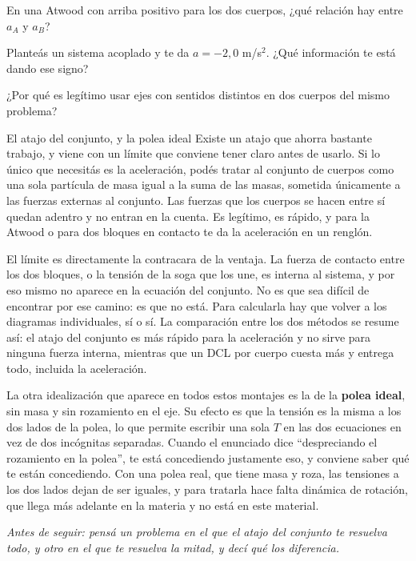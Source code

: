 \documentclass[11pt,openany]{book}
\begin{document}
\begin{chequeo}
\item En una Atwood con arriba positivo para los dos cuerpos, ¿qué relación hay entre $a_A$ y $a_B$?
\item Planteás un sistema acoplado y te da $a = -2{,}0$ m/s$^2$. ¿Qué información te está dando ese signo?
\item ¿Por qué es legítimo usar ejes con sentidos distintos en dos cuerpos del mismo problema?
\end{chequeo}

\begin{bloque}{El atajo del conjunto, y la polea ideal}
Existe un atajo que ahorra bastante trabajo, y viene con un límite que conviene tener claro antes de usarlo. Si lo único que necesitás es la aceleración, podés tratar al conjunto de cuerpos como una sola partícula de masa igual a la suma de las masas, sometida únicamente a las fuerzas externas al conjunto. Las fuerzas que los cuerpos se hacen entre sí quedan adentro y no entran en la cuenta. Es legítimo, es rápido, y para la Atwood o para dos bloques en contacto te da la aceleración en un renglón.

El límite es directamente la contracara de la ventaja. La fuerza de contacto entre los dos bloques, o la tensión de la soga que los une, es interna al sistema, y por eso mismo no aparece en la ecuación del conjunto. No es que sea difícil de encontrar por ese camino: es que no está. Para calcularla hay que volver a los diagramas individuales, sí o sí. La comparación entre los dos métodos se resume así: el atajo del conjunto es más rápido para la aceleración y no sirve para ninguna fuerza interna, mientras que un DCL por cuerpo cuesta más y entrega todo, incluida la aceleración.

La otra idealización que aparece en todos estos montajes es la de la \textbf{polea ideal}, sin masa y sin rozamiento en el eje. Su efecto es que la tensión es la misma a los dos lados de la polea, lo que permite escribir una sola $T$ en las dos ecuaciones en vez de dos incógnitas separadas. Cuando el enunciado dice ``despreciando el rozamiento en la polea'', te está concediendo justamente eso, y conviene saber qué te están concediendo. Con una polea real, que tiene masa y roza, las tensiones a los dos lados dejan de ser iguales, y para tratarla hace falta dinámica de rotación, que llega más adelante en la materia y no está en este material.

\textit{Antes de seguir: pensá un problema en el que el atajo del conjunto te resuelva todo, y otro en el que te resuelva la mitad, y decí qué los diferencia.}
\end{bloque}
\end{document}
